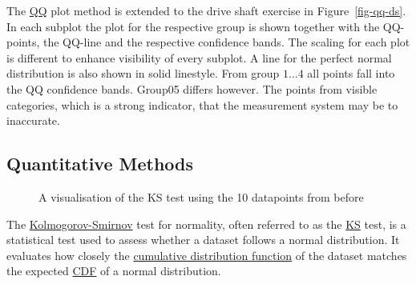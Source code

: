 \documentclass[
  a4paper,
]{scrbook}
\begin{document}
The \hyperref[qq]{QQ} plot method is extended to the drive shaft
exercise in Figure~\ref{fig-qq-ds}. In each subplot the plot for the
respective group is shown together with the QQ-points, the QQ-line and
the respective confidence bands. The scaling for each plot is different
to enhance visibility of every subplot. A line for the perfect normal
distribution is also shown in solid linestyle. From group \(1 \ldots 4\)
all points fall into the QQ confidence bands. Group05 differs however.
The points from visible categories, which is a strong indicator, that
the measurement system may be to inaccurate.

\subsection{Quantitative Methods}\label{sec-ks-test}

\begin{figure}[H]


\caption{\label{fig-ks-smpl}A visualisation of the KS test using the 10
datapoints from before}

\end{figure}%

The \hyperref[KS]{Kolmogorov-Smirnov} test for normality, often referred
to as the \hyperref[KS]{KS} test, is a statistical test used to assess
whether a dataset follows a normal distribution. It evaluates how
closely the \hyperref[cdf]{cumulative distribution function} of the
dataset matches the expected \hyperref[cdf]{CDF} of a normal
distribution.
\end{document}
